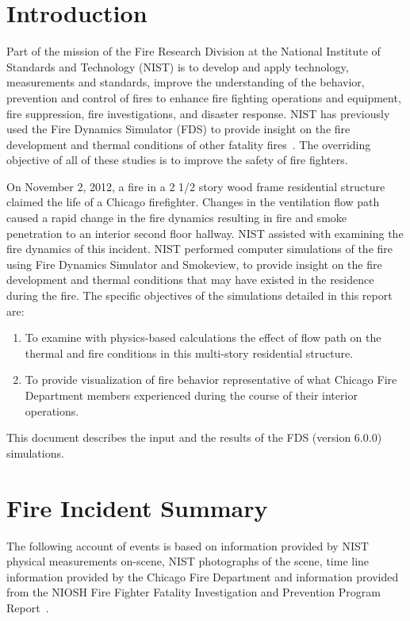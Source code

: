 \documentclass[11pt,oneside]{book}
\begin{document}
\mainmatter

\chapter{Introduction}
Part of the mission of the Fire Research Division at the National Institute of Standards and Technology (NIST) is to develop and apply technology, measurements and standards, improve the understanding of the behavior, prevention and control of fires to enhance fire fighting operations and equipment, fire suppression, fire investigations, and disaster response. NIST has previously used the Fire Dynamics Simulator (FDS) to provide insight on the fire development and thermal conditions of other fatality fires~\cite{Madrzykowski:1,Iowa,Texas,Cook_County,Grosshandler:Station,Bryner:Charleston,barowy:texas}. The overriding objective of all of these studies is to improve the safety of fire fighters.

On November 2, 2012, a fire in a 2 1/2 story wood frame residential structure claimed the life of a Chicago firefighter.  Changes in the ventilation flow path caused a rapid change in the fire dynamics resulting in fire and smoke penetration to an interior second floor hallway. NIST assisted with examining the fire dynamics of this incident. NIST performed computer simulations of the fire using Fire Dynamics Simulator and Smokeview, to provide insight on the fire development and thermal conditions that may have existed in the residence during the fire. The specific objectives of the simulations detailed in this report are: 
\begin{enumerate}
\item To examine with physics-based calculations the effect of flow path on the thermal and fire conditions in this multi-story residential structure.
\item To provide visualization of fire behavior representative of what Chicago Fire Department members experienced during the course of their interior operations.
\end{enumerate}
This document describes the input and the results of the FDS (version 6.0.0) simulations.



\chapter{Fire Incident Summary}
\label{fire_sum}
The following account of events is based on information provided by NIST physical measurements on-scene, NIST photographs of the scene, time line information provided by the Chicago Fire Department and information provided from the NIOSH Fire Fighter Fatality Investigation and Prevention Program Report~\cite{NIOSH:Bowyer}.
\end{document}
